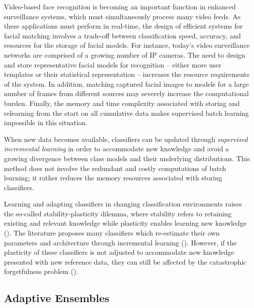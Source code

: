 Video-based face recognition is becoming an important function in enhanced surveillance systems, which must simultaneously process many video feeds.
As these applications must perform in real-time, the design of efficient systems for facial matching involves a trade-off between classification speed, accuracy, and resources for the storage of facial models.
For instance, today's video surveillance networks are comprised of a growing number of IP cameras.
The need to design and store representative facial models for recognition -- either more user templates or their statistical representation -- increases the resource requirements of the system.
In addition, matching captured facial images to models for a large number of frames from different sources may severely increase the computational burden.
Finally, the memory and time complexity associated with storing and relearning from the start on all cumulative data makes supervised batch learning impossible in this situation. 

When new data becomes available, classifiers can be updated through \emph{supervised incremental learning} in order to accommodate new knowledge and avoid a growing divergence between class models and their underlying distributions. This method does not involve the redundant and costly computations of batch learning; it rather reduces the memory resources associated with storing classifiers.

Learning and adapting classifiers in changing classification environments raises the so-called stability-plasticity dilemma, where stability refers to retaining existing and relevant knowledge while plasticity enables learning new knowledge (\cite{grossberg88}).
The literature proposes many classifiers which re-estimate their own parameters and architecture through incremental learning (\cite{carpenter91, chakraborty03, fritzke96, okamoto03, ruping01}).
However, if the plasticity of these classifiers is not adjusted to accommodate new knowledge presented with new reference data, they can still be affected by the catastrophic forgetfulness problem (\cite{canuto00, dubrawski97, fung03, granger07, kapp09}).

\subsection{Adaptive Ensembles}

